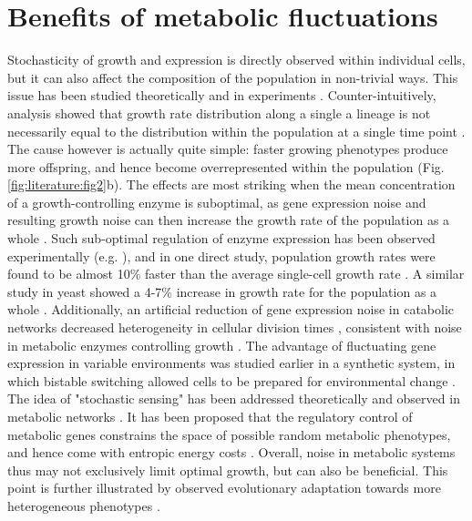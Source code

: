 \section{Benefits of metabolic fluctuations}
Stochasticity of growth and expression is directly observed within individual cells, but it can also affect the composition of the population in non-trivial ways. This issue has been studied theoretically and in experiments \cite{Tanase-Nicola2008, Cerulus2016, Hashimoto2016}. Counter-intuitively, analysis showed that growth rate distribution along a single a lineage is not necessarily equal to the distribution within the population at a single time point \cite{Hashimoto2016}. The cause however is actually quite simple: faster growing phenotypes produce more offspring, and hence become overrepresented within the population (Fig. \ref{fig:literature:fig2}b). The effects are most striking when the mean concentration of a growth-controlling enzyme is suboptimal, as gene expression noise and resulting growth noise can then increase the growth rate of the population as a whole \cite{Tanase-Nicola2008}. Such sub-optimal regulation of enzyme expression has been observed experimentally (e.g. \cite{Towbin2017}), and in one direct study, population growth rates were found to be almost 10\% faster than the average single-cell growth rate \cite{Hashimoto2016}.  A similar study in yeast showed a 4-7\% increase in growth rate for the population as a whole \cite{Cerulus2016}. Additionally, an artificial reduction of gene expression noise in catabolic networks decreased heterogeneity in cellular division times \cite{Cerulus2016}, consistent with noise in metabolic enzymes controlling growth \cite{Kiviet2014}. 
The advantage of fluctuating gene expression in variable environments was studied earlier in a synthetic system, in which bistable switching allowed cells to be prepared for environmental change \cite{Kashiwagi2006}. The idea of "stochastic sensing" has been addressed theoretically \cite{Kussell2005} and observed in metabolic networks \cite{New2014, Boulineau2013, Miot2015}. It has been proposed that the regulatory control of metabolic genes constrains the space of possible random metabolic phenotypes, and hence come with entropic energy costs \cite{Martino2016}. Overall, noise in metabolic systems thus may not exclusively limit optimal growth, but can also be beneficial. This point is further illustrated by observed evolutionary adaptation towards more heterogeneous phenotypes \cite{Schreiber2016, Metzger2015, Mars2015, Beaumont2009, VanDijk2015}. 

